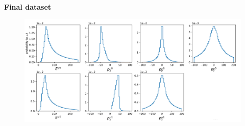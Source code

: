 \begin{frame}{\underline{\secname}}


\begin{center}
\textbf{Final dataset}
\end{center}

\begin{figure}[H]
\begin{center}
\includegraphics[width=\textwidth]{slides/pdfresizer.com-pdf-crop}
\end{center}
\end{figure}

\end{frame}

